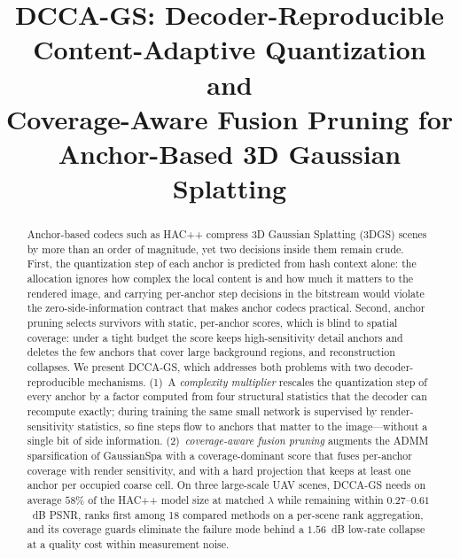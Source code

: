 \documentclass[conference]{IEEEtran}
\newcommand{\DCCA}{DCCA-GS}
\begin{document}
\title{DCCA-GS: Decoder-Reproducible Content-Adaptive Quantization and\\
Coverage-Aware Fusion Pruning for Anchor-Based 3D Gaussian Splatting}

\author{
}

\maketitle

\begin{abstract}
Anchor-based codecs such as HAC++ compress 3D Gaussian Splatting (3DGS) scenes by
more than an order of magnitude, yet two decisions inside them remain crude. First,
the quantization step of each anchor is predicted from hash context alone: the
allocation ignores how complex the local content is and how much it matters to the
rendered image, and carrying per-anchor step decisions in the bitstream would violate
the zero-side-information contract that makes anchor codecs practical. Second,
anchor pruning selects survivors with static, per-anchor scores, which is blind to
spatial coverage: under a tight budget the score keeps high-sensitivity detail
anchors and deletes the few anchors that cover large background regions, and
reconstruction collapses. We present \DCCA{}, which addresses both problems with two
decoder-reproducible mechanisms. (1)~A \emph{complexity multiplier} rescales the
quantization step of every anchor by a factor computed from four structural
statistics that the decoder can recompute exactly; during training the same small
network is supervised by render-sensitivity statistics, so fine steps flow to anchors
that matter to the image---without a single bit of side information. (2)~\emph{coverage-aware
fusion pruning} augments the ADMM sparsification of GaussianSpa with a
coverage-dominant score that fuses per-anchor coverage with render sensitivity, and
with a hard projection that keeps at least one anchor per occupied coarse cell. On
three large-scale UAV scenes, \DCCA{} needs on average $58\%$ of the HAC++ model size
at matched $\lambda$ while remaining within $0.27$--$0.61$~dB PSNR, ranks first
among 18 compared methods on a per-scene rank aggregation, and its coverage
guards eliminate the failure mode behind a $1.56$~dB low-rate collapse at a
quality cost within measurement noise.
\end{abstract}
\end{document}
